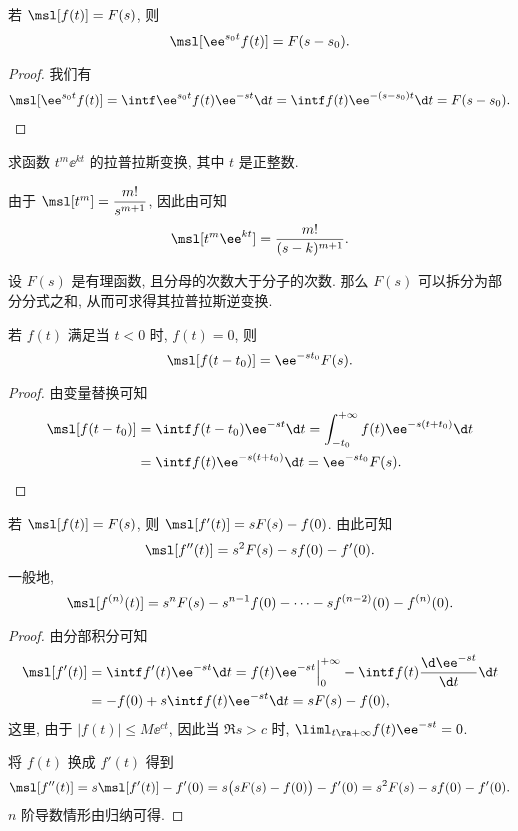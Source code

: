 \begin{theorem}[位移性质]
  \label{thm:laplace-shift-property}
  若 $\msl[f(t)]=F(s)$, 则 
  \[
    \msl[\ee^{s_0 t}f(t)]=F(s-s_0).
  \]
\end{theorem}

\begin{proof}
  我们有
  \begin{align*}
     \msl[\ee^{s_0 t}f(t)]
    =\intf \ee^{s_0 t}f(t)\ee^{-st}\d t
    =\intf f(t)\ee^{-(s-s_0) t}\d t
     =F(s-s_0).\qedhere
  \end{align*}
\end{proof}

\begin{example}
  求函数 $t^m\ee^{kt}$ 的拉普拉斯变换, 其中 $t$ 是正整数.
\end{example}

\begin{solution}
  由于 $\msl[t^m]=\dfrac{m!}{s^{m+1}}$, 因此由\thmLShift 可知
  \[
    \msl[t^m\ee^{kt}]=\frac{m!}{(s-k)^{m+1}}.
  \]
\end{solution}

设 $F(s)$ 是有理函数, 且分母的次数大于分子的次数.
那么 $F(s)$ 可以拆分为部分分式之和, 从而可求得其拉普拉斯逆变换.

\begin{theorem}[延迟性质]
  若 $f(t)$ 满足当 $t<0$ 时, $f(t)=0$, 则
  \[
    \msl[f(t-t_0)]=\ee^{-s t_0}F(s).
  \]
\end{theorem}

\begin{proof}
  由变量替换可知
  \begin{align*}
      \msl[f(t-t_0)]
    &=\intf f(t-t_0)\ee^{-s t}\d t
     =\int_{-t_0}^{+\infty} f(t)\ee^{-s(t+t_0)}\d t\\
    &=\intf f(t)\ee^{-s(t+t_0)}\d t
     =\ee^{-s t_0}F(s).\qedhere
  \end{align*}
\end{proof}

\begin{theorem}[微分性质]
  \label{thm:laplace-differential-property}
  若 $\msl[f(t)]=F(s)$, 则 $\msl[f'(t)]=sF(s)-f(0)$.
  由此可知
  \[
    \msl[f''(t)]=s^2F(s)-sf(0)-f'(0).
  \]
  一般地,
  \[
    \msl[f^{(n)}(t)]=s^nF(s)-s^{n-1}f(0)-\cdots-sf^{(n-2)}(0)-f^{(n)}(0).
  \]
\end{theorem}

\begin{proof}
  由分部积分可知
  \begin{align*}
     \msl[f'(t)]
    &=\intf f'(t)\ee^{-st}\d t
    =f(t)\ee^{-st}\Big|_0^{+\infty}-\intf f(t)\frac{\d \ee^{-st}}{\d t}\d t\\
    &=-f(0)+s\intf f(t)\ee^{-st}\d t
    =sF(s)-f(0),
  \end{align*}
  这里, 由于 $|f(t)|\le M\ee^{ct}$, 因此当 $\Re s>c$ 时, $\liml_{t\ra+\infty} f(t)\ee^{-st}=0$.
  
  将 $f(t)$ 换成 $f'(t)$ 得到
  \[
    \msl[f''(t)]=s\msl[f'(t)]-f'(0)
    =s\bigl(sF(s)-f(0)\bigr)-f'(0)
    =s^2F(s)-sf(0)-f'(0).
  \]
  $n$ 阶导数情形由归纳可得.
\end{proof}

